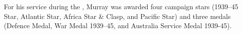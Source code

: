 
For his service during the , Murray was awarded\cite{RMWDeptAirLetter} four campaign stars (1939--45 Star, Atlantic Star, Africa Star \& Clasp, and Pacific Star) and three medals (Defence Medal, War Medal 1939--45, and Australia Service Medal 1939-45).
